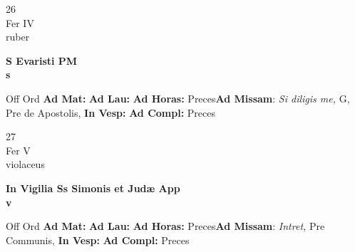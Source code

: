 \documentclass[10pt, openany]{book}
\begin{document}
        \begin{center}
            \begin{minipage}{3.5in}
                \vspace{2em}
                \begin{minipage}{0.5in}
                    {\Huge 26} \\
                    {\normalsize Fer IV} \\
                    {\normalsize ruber}
                \end{minipage}
                \begin{minipage}{3.0in}
                    \textbf{ \large S Evaristi PM \\
                    \textnormal{\normalsize s}} \\ 
                \end{minipage}
                \begin{justify}Off Ord
                    \textbf{Ad Mat: }
                    \textbf{Ad Lau: }
                    \textbf{Ad Horas: }Preces\textbf{Ad Missam}: \textit{Si diligis me,} G, Pre de Apostolis,  
                    \textbf{In Vesp: }
                    \textbf{Ad Compl: }Preces
                \end{justify}
            \end{minipage}
        \end{center}
    
        \begin{center}
            \begin{minipage}{3.5in}
                \vspace{2em}
                \begin{minipage}{0.5in}
                    {\Huge 27} \\
                    {\normalsize Fer V} \\
                    {\normalsize violaceus}
                \end{minipage}
                \begin{minipage}{3.0in}
                    \textbf{ \large In Vigilia Ss Simonis et Judæ App \\
                    \textnormal{\normalsize v}} \\ 
                \end{minipage}
                \begin{justify}Off Ord
                    \textbf{Ad Mat: }
                    \textbf{Ad Lau: }
                    \textbf{Ad Horas: }Preces\textbf{Ad Missam}: \textit{Intret,} Pre Communis,  
                    \textbf{In Vesp: }
                    \textbf{Ad Compl: }Preces
                \end{justify}
            \end{minipage}
        \end{center}
    
\end{document}
